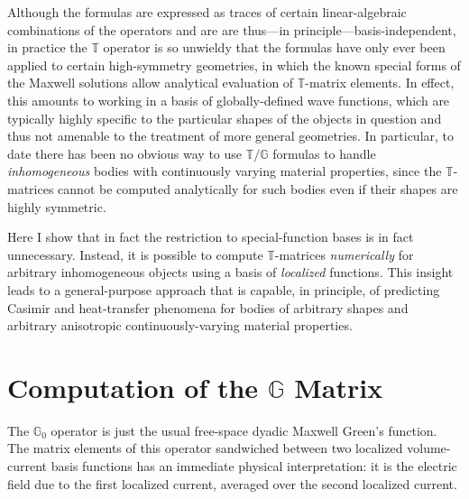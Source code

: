 \documentclass[letterpaper]{article}
\begin{document}
Although the formulas are expressed as traces of 
certain linear-algebraic combinations of the operators 
and are are thus---in principle---basis-independent, in practice the 
$\mathbb{T}$ operator is so unwieldy that the formulas have only
ever been applied to certain high-symmetry geometries, in which
the known special forms of the Maxwell solutions allow 
analytical evaluation of $\mathbb{T}$-matrix elements.
In effect, this amounts to working in a basis of globally-defined
wave functions, which are typically highly specific to the 
particular shapes of the objects in question and thus not 
amenable to the treatment of more general geometries.
In particular, to date there has been no obvious way to use
$\mathbb{T}/\mathbb{G}$ formulas to handle \textit{inhomogeneous}
bodies with continuously varying material properties, since 
the $\mathbb{T}$-matrices cannot be computed analytically
for such bodies even if their shapes are highly symmetric.

Here I show that in fact the restriction to special-function
bases is in fact unnecessary. Instead, it is possible to compute 
$\mathbb{T}$-matrices \textit{numerically} for arbitrary 
inhomogeneous objects using a basis of \textit{localized} 
functions. This insight leads to a general-purpose approach
that is capable, in principle, of predicting Casimir and 
heat-transfer phenomena for bodies of arbitrary shapes and
arbitrary anisotropic continuously-varying material properties. 
\section{Computation of the $\mathbb{G}$ Matrix }

The $\mathbb{G}_0$ operator is just the usual free-space dyadic 
Maxwell Green's function. The matrix elements of this operator 
sandwiched between two localized volume-current basis functions 
has an immediate physical interpretation: it is the electric field 
due to the first localized current, averaged over the second 
localized current.
\end{document}
